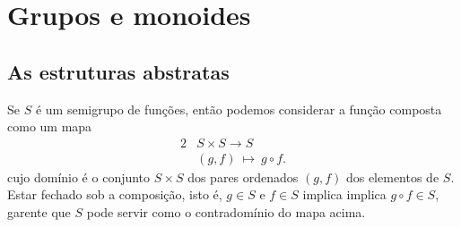 \section{Grupos e monoides}
   \subsection{As estruturas abstratas}
      Se $S$ é um semigrupo de funções, então podemos considerar a função composta como um mapa
      \begin{alignat}{2}
         &S \times S \to S \nonumber\\
         &\left(g,f\right)\ \mapsto\ g \circ f.
         \nonumber
      \end{alignat}
      cujo domínio é o conjunto $S \times S$ dos pares ordenados $(g,f)$ dos elementos de $S$. Estar fechado sob a composição, isto é, $g\in S$ e $f\in S$ implica implica $g\circ f \in S$, garente que $S$ pode servir como o contradomínio do mapa acima.

